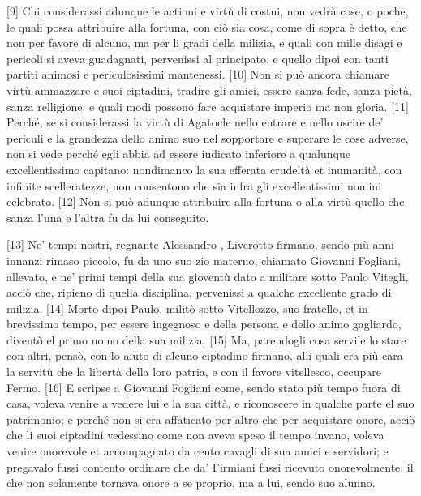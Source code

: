 {[}9{]} Chi considerassi adunque le actioni e virtù di costui, non vedrà
cose, o poche, le quali possa attribuire alla fortuna, con ciò sia cosa,
come di sopra è detto, che non per favore di alcuno, ma per li gradi
della milizia, e quali con mille disagi e pericoli si aveva guadagnati,
pervenissi al principato, e quello dipoi con tanti partiti animosi e
periculosissimi mantenessi. {[}10{]} Non si può ancora chiamare virtù
ammazzare e suoi ciptadini, tradire gli amici, essere sanza fede, sanza
pietà, sanza relligione: e quali modi possono fare acquistare imperio ma
non gloria. {[}11{]} Perché, se si considerassi la virtù di Agatocle
nello entrare e nello uscire de' periculi e la grandezza dello animo suo
nel sopportare e superare le cose adverse, non si vede perché egli abbia
ad essere iudicato inferiore a qualunque excellentissimo capitano:
nondimanco la sua efferata crudeltà et inumanità, con infinite
scelleratezze, non consentono che sia infra gli excellentissimi uomini
celebrato. {[}12{]} Non si può adunque attribuire alla fortuna o alla
virtù quello che sanza l'una e l'altra fu da lui conseguito.

{[}13{]} Ne' tempi nostri, regnante Alessandro , Liverotto firmano,
sendo più anni innanzi rimaso piccolo, fu da uno suo zio materno,
chiamato Giovanni Fogliani, allevato, e ne' primi tempi della sua
gioventù dato a militare sotto Paulo Vitegli, acciò che, ripieno di
quella disciplina, pervenissi a qualche excellente grado di milizia.
{[}14{]} Morto dipoi Paulo, militò sotto Vitellozzo, suo fratello, et in
brevissimo tempo, per essere ingegnoso e della persona e dello animo
gagliardo, diventò el primo uomo della sua milizia. {[}15{]} Ma,
parendogli cosa servile lo stare con altri, pensò, con lo aiuto di
alcuno ciptadino firmano, alli quali era più cara la servitù che la
libertà della loro patria, e con il favore vitellesco, occupare Fermo.
{[}16{]} E scripse a Giovanni Fogliani come, sendo stato più tempo fuora
di casa, voleva venire a vedere lui e la sua città, e riconoscere in
qualche parte el suo patrimonio; e perché non si era affaticato per
altro che per acquistare onore, acciò che li suoi ciptadini vedessino
come non aveva speso il tempo invano, voleva venire onorevole et
accompagnato da cento cavagli di sua amici e servidori; e pregavalo
fussi contento ordinare che da' Firmiani fussi ricevuto onorevolmente:
il che non solamente tornava onore a se proprio, ma a lui, sendo suo
alunno.

\quebra

